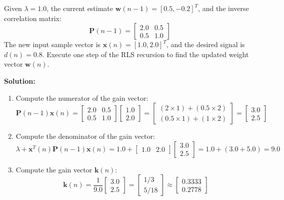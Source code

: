 \documentclass[12pt,a4paper]{article}
\begin{document}
\begin{tcolorbox}[examplebox, title={Example: RLS Iteration Computation}]
Given $\lambda = 1.0$, the current estimate $\mathbf{w}(n-1) = [0.5, -0.2]^T$, and the inverse correlation matrix:
\[
  \mathbf{P}(n-1) = \begin{bmatrix} 2.0 & 0.5 \\ 0.5 & 1.0 \end{bmatrix}
\]
The new input sample vector is $\mathbf{x}(n) = [1.0, 2.0]^T$, and the desired signal is $d(n) = 0.8$. Execute one step of the RLS recursion to find the updated weight vector $\mathbf{w}(n)$.

\textbf{Solution:}
\begin{enumerate}[label=\textbf{\arabic*.}, leftmargin=*, itemsep=4pt]
  \item Compute the numerator of the gain vector:
    \[
      \mathbf{P}(n-1)\mathbf{x}(n) = \begin{bmatrix} 2.0 & 0.5 \\ 0.5 & 1.0 \end{bmatrix} \begin{bmatrix} 1.0 \\ 2.0 \end{bmatrix} = \begin{bmatrix} (2 \times 1) + (0.5 \times 2) \\ (0.5 \times 1) + (1 \times 2) \end{bmatrix} = \begin{bmatrix} 3.0 \\ 2.5 \end{bmatrix}
    \]
  \item Compute the denominator of the gain vector:
    \[
      \lambda + \mathbf{x}^T(n)\mathbf{P}(n-1)\mathbf{x}(n) = 1.0 + \begin{bmatrix} 1.0 & 2.0 \end{bmatrix} \begin{bmatrix} 3.0 \\ 2.5 \end{bmatrix} = 1.0 + (3.0 + 5.0) = 9.0
    \]
  \item Compute the gain vector $\mathbf{k}(n)$:
    \[
      \mathbf{k}(n) = \frac{1}{9.0} \begin{bmatrix} 3.0 \\ 2.5 \end{bmatrix} = \begin{bmatrix} 1/3 \\ 5/18 \end{bmatrix} \approx \begin{bmatrix} 0.3333 \\ 0.2778 \end{bmatrix}
\]
\end{enumerate}
\end{tcolorbox}
\end{document}
